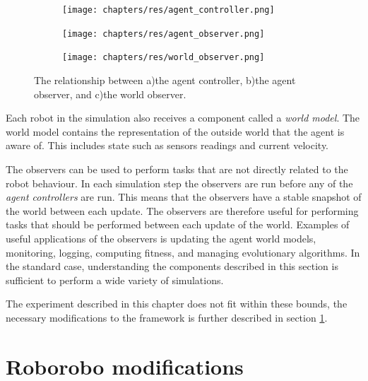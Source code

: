 \begin{figure}[H]
	\centering
	\begin{subfigure}{0.31\textwidth}
		\label{fig:controller}
		\centering
		\hspace*{1.15cm}\texttt{[image: chapters/res/agent\_controller.png]}
		\caption{}
	\end{subfigure}
	\begin{subfigure}{0.31\textwidth}
		\label{fig:agent-observer}
		\centering
		\texttt{[image: chapters/res/agent\_observer.png]}
		\caption{}
	\end{subfigure}
	\begin{subfigure}{0.31\textwidth}
		\label{fig:world-observer}
		\centering
		\texttt{[image: chapters/res/world\_observer.png]}
		\caption{}
	\end{subfigure}
	\caption{The relationship between a)the agent controller, b)the agent observer, and c)the world observer. }
	\label{fig:component-relationship}
\end{figure}

Each robot in the simulation also receives a component called a \emph{world model}.
The world model contains the representation of the outside world that the agent is aware of.
This includes state such as sensors readings and current velocity.

The observers can be used to perform tasks that are not directly related to the robot behaviour.
In each simulation step the observers are run before any of the \emph{agent controllers} are run.
This means that the observers have a stable snapshot of the world between each update.
The observers are therefore useful for performing tasks that should be performed between each update of the world.
Examples of useful applications of the observers is updating the agent world models, monitoring, logging, computing fitness, and managing evolutionary algorithms.
In the standard case, understanding the components described in this section is sufficient to perform a wide variety of simulations.


The experiment described in this chapter does not fit within these bounds, the necessary modifications to the framework is further described in section \ref{sec:modifications}.



\section{Roborobo modifications}
\label{sec:modifications}

